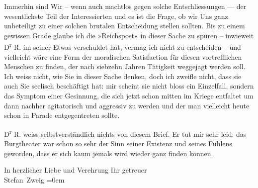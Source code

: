                Immerhin sind Wir – wenn auch machtlos gegen solche Entschliessungen — der
               wesentlichste Teil der Interessierten und es ist die Frage, ob wir Uns ganz
               unbeteiligt zu einer solchen brutalen Entscheidung stellen sollten. Bis zu einem
               gewissen Grade glaube ich die »Reichspost« in
               dieser Sache zu spüren – inwieweit D\textsuperscript{r}{ }R. im seiner \label{K_L03653-3v}\label{K_L03653-3} Etwas verschuldet hat, vermag ich nicht zu entscheiden – und vielleicht wäre
               eine Form der moralischen Satisfaction für diesen vortrefflichen {\pb}Menschen zu finden, der nach siebzehn
               Jahren Tätigkeit \label{K_L03653-4v}\label{K_L03653-4}
               weggejagt werden soll. Ich weiss nicht, wie Sie in dieser Sache denken, doch ich
               zweifle nicht, dass sie auch Sie seelisch beschäftigt hat: mir scheint sie nicht
               bloss ein Einzelfall, sondern das Symptom einer Gesinnung, die sich jetzt schon
               mitten im Kriege entfaltet um dann nachher agitatorisch und aggressiv zu werden und
               der man vielleicht heute schon in Parade entgegentreten sollte.\pend
           
\pstart
           D\textsuperscript{r}{ }R. weiss selbstverständlich nichts von diesem
               Brief. Er tut mir sehr leid: das Burgtheater war
               schon so sehr der Sinn seiner Existenz und seines Fühlens geworden, dass er sich kaum
               jemals wird wieder ganz finden können.\pend
           
\pstart
           In herzlicher Liebe und Verehrung Ihr getreuer{\\[\baselineskip]}\spacefill\mbox{Stefan Zweig}\pend
           \leftskip=0em{}\endnumbering{}
\begin{anhang}
\end{anhang}
      